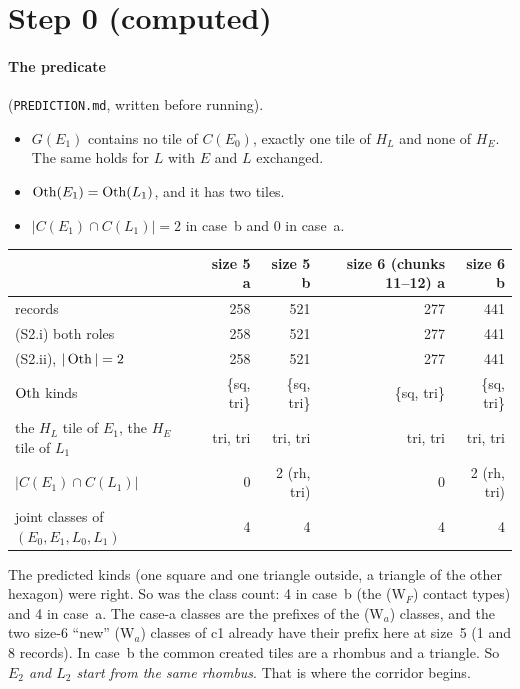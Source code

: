 \documentclass[11pt]{article}
\theoremstyle{definition}\newtheorem{definition}[theorem]{Definition}\newtheorem{remark}[theorem]{Remark}
\begin{document}
\section{Step 0 (computed)}\label{sec:step0}
\paragraph{The predicate} (\texttt{PREDICTION.md}, written before running).
\begin{itemize}
\item[(S2.i)] $G(E_1)$ contains no tile of $C(E_0)$, exactly one tile of $H_L$ and none of $H_E$. The same holds for $L$ with $E$ and $L$ exchanged.
\item[(S2.ii)] $\operatorname{Oth}(E_1)=\operatorname{Oth}(L_1)$, and it has two tiles.
\item[(S2.iii)] $|C(E_1)\cap C(L_1)|=2$ in case~b and $0$ in case~a.
\end{itemize}
\begin{center}\small\begin{tabular}{lrrrr}\toprule
& size 5 a & size 5 b & size 6 (chunks 11--12) a & size 6 b\\\midrule
records & 258 & 521 & 277 & 441\\
(S2.i) both roles & 258 & 521 & 277 & 441\\
(S2.ii), $|\operatorname{Oth}|=2$ & 258 & 521 & 277 & 441\\
$\operatorname{Oth}$ kinds & \{sq, tri\} & \{sq, tri\} & \{sq, tri\} & \{sq, tri\}\\
the $H_L$ tile of $E_1$, the $H_E$ tile of $L_1$ & tri, tri & tri, tri & tri, tri & tri, tri\\
$|C(E_1)\cap C(L_1)|$ & 0 & 2 (rh, tri) & 0 & 2 (rh, tri)\\
joint classes of $(E_0,E_1,L_0,L_1)$ & 4 & 4 & 4 & 4\\\bottomrule
\end{tabular}\end{center}
The predicted kinds (one square and one triangle outside, a triangle of the other hexagon) were right. So was the class count: 4 in case~b (the (W$_F$) contact types) and 4 in case~a. The case-a classes are the prefixes of the (W$_a$) classes, and the two size-6 ``new'' (W$_a$) classes of c1 already have their prefix here at size~5 (1 and 8 records). In case~b the common created tiles are a rhombus and a triangle. So \emph{$E_2$ and $L_2$ start from the same rhombus}. That is where the corridor begins.
\end{document}
